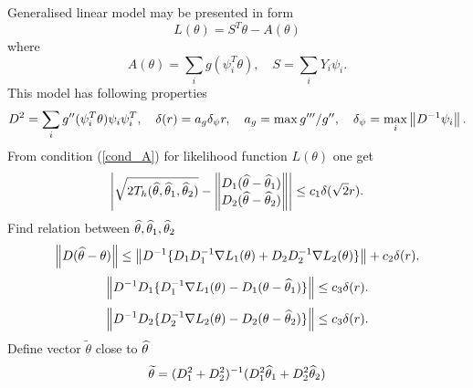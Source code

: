 



\usepackage{flowchart}
\usetikzlibrary{arrows}

\usepackage{natbib}






Generalised linear model may be presented in form
\[
L(\theta) = S^T \theta - A(\theta)
\]
where
\[
A(\theta) = \sum_i g(\psi_i^T \theta), 
\quad
S = \sum_i Y_i \psi_i.
\]
This model has following properties
\[
D^2 = \sum_i g''(\psi_i^T \theta) \psi_i \psi_i^T,
\quad
\delta(r) = a_g \delta_{\psi} r,
\quad  a_g = \max g'''/g'',
\quad \delta_{\psi} = \max_i \left\Vert D^{-1} \psi_i \right\Vert.
\]
From condition (\ref{cond_A}) for likelihood function $L(\theta)$ one get
\[
\left |
\sqrt{2 T_h(\widehat{\theta}, \widehat{\theta}_1, \widehat{\theta}_2)} - 
\left\Vert 
\begin{matrix}
D_1(\widehat{\theta} - \widehat{\theta}_1) \\
D_2(\widehat{\theta} - \widehat{\theta}_2) \\
\end{matrix} \right\Vert
\right |
\leq c_1 \delta(\sqrt{2}r).
\]
Find relation between $\widehat{\theta}, \widehat{\theta}_1, \widehat{\theta}_2$
\[
\left\Vert D (\widehat{\theta} - \theta) \right\Vert \leq 
\left\Vert 
D^{-1}\{ D_1 D_1^{-1}  \nabla L_1(\theta) + D_2 D_2^{-1} \nabla L_2(\theta) \}
 \right\Vert + c_2 \delta(r).
\]
\[
\left\Vert  D^{-1} D_1 \{ D_1^{-1}  \nabla L_1(\theta) -  D_1(\theta - \widehat{\theta}_1) \}  \right\Vert \leq c_3 \delta(r).
\]
\[
\left\Vert  D^{-1} D_2 \{ D_2^{-1}  \nabla L_2(\theta) -  D_2(\theta - \widehat{\theta}_2) \}  \right\Vert \leq c_3 \delta(r).
\]
Define vector $\widetilde{\theta}$ close to $\widehat{\theta}$
\[
\widetilde{\theta} = (D_1^2 + D_2^2)^{-1} (D_1^2 \widehat{\theta}_1 + D_2^2 \widehat{\theta}_2)
\]

